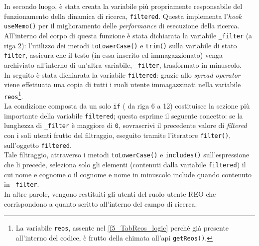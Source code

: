 

In secondo luogo, è stata creata la variabile più propriamente responsabile del funzionamento della dinamica di ricerca, \texttt{filtered}. Questa implementa l'\textit{hook} \texttt{useMemo()} per il miglioramento delle \textit{performance} di esecuzione della ricerca.\\
All'interno del corpo di questa funzione è stata dichiarata la variabile \texttt{\_filter} (a riga 2): l'utilizzo dei metodi \texttt{toLowerCase()} e \texttt{trim()} sulla variabile di stato \texttt{filter}, assicura che il testo (in essa inserito ed immagazzionato) venga archiviato all'interno di un'altra variabile, \texttt{\_filter}, trasformato in minuscolo.\\
In seguito è stata dichiarata la variabile \texttt{filtered}: grazie allo \textit{spread operator} viene effettuata una copia di tutti i ruoli utente immagazzinati nella variabile \texttt{reos}\footnote{La variabile \texttt{reos}, assente nel \autoref{f5_TabReos_logic} perché già presente all'interno del codice, è frutto della chimata all'\gls{api} \texttt{getReos()}.}.\\
La condizione composta da un solo \texttt{if} ( da riga 6 a 12) costituisce la sezione più importante della variabile \texttt{filtered}; questa esprime il seguente concetto: se la lunghezza di \texttt{\_filter} è maggiore di \texttt{0}, sovrascrivi il precedente valore di \textit{filtered} con i soli utenti frutto del filtraggio, eseguito tramite l'iteratore \texttt{filter()}, sull'oggetto \texttt{filtered}.\\
Tale filtraggio, attraverso i metodi \texttt{toLowerCase()} e \texttt{includes()} sull'espressione che li precede, seleziona solo gli elementi (contenuti dalla variabile \texttt{filtered}) il cui nome e cognome o il cognome e nome in minuscolo include quando contenuto in \texttt{\_filter}.\\
In altre parole, vengono restituiti gli utenti del ruolo utente REO che corrispondono a quanto scritto all'interno del campo di ricerca.



